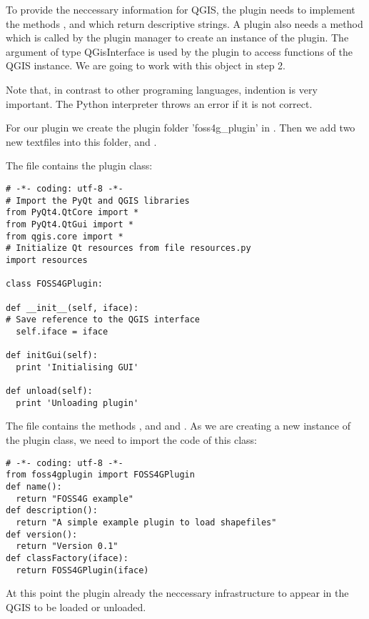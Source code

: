 To provide the neccessary information for QGIS, the plugin needs to implement
the methods ,  and 
which return descriptive strings. A plugin also needs a method
 which is called by the plugin manager to create
an instance of the plugin. The argument of type QGisInterface is used by the
plugin to access functions of the QGIS instance. We are going to work with
this object in step 2.  

Note that, in contrast to other programing languages, indention is very
important. The Python interpreter throws an error if it is not correct.

For our plugin we create the plugin folder 'foss4g\_plugin' in
. Then we add two new textfiles into this
folder,  and .

The file  contains the plugin class:

\begin{verbatim}
# -*- coding: utf-8 -*-
# Import the PyQt and QGIS libraries
from PyQt4.QtCore import *
from PyQt4.QtGui import *
from qgis.core import *
# Initialize Qt resources from file resources.py
import resources

class FOSS4GPlugin:

def __init__(self, iface):
# Save reference to the QGIS interface
  self.iface = iface

def initGui(self):
  print 'Initialising GUI'

def unload(self):
  print 'Unloading plugin'
\end{verbatim}

The file  contains the methods ,
 and  and . As
we are creating a new instance of the plugin class, we need to import the
code of this class:

\begin{verbatim}
# -*- coding: utf-8 -*-
from foss4gplugin import FOSS4GPlugin
def name():
  return "FOSS4G example"
def description():
  return "A simple example plugin to load shapefiles"
def version():
  return "Version 0.1"
def classFactory(iface):
  return FOSS4GPlugin(iface)
\end{verbatim}

At this point the plugin already the neccessary infrastructure to appear in
the QGIS  to be
loaded or unloaded. 

